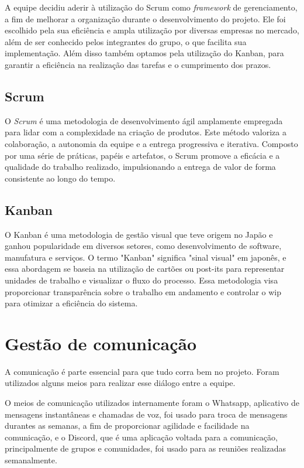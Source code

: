 A equipe decidiu aderir à utilização do Scrum como \textit{framework} de gerenciamento, a fim de melhorar a organização durante o desenvolvimento do projeto. Ele foi escolhido pela sua eficiência e ampla utilização por diversas empresas no mercado, além de ser conhecido pelos integrantes do grupo, o que facilita sua implementação.  Além disso também optamos pela utilização do Kanban, para garantir a eficiência na realização das tarefas e o cumprimento dos prazos.

\subsection{Scrum}

O \textit{Scrum} é uma metodologia de desenvolvimento ágil amplamente empregada para lidar com a complexidade na criação de produtos. Este método valoriza a colaboração, a autonomia da equipe e a entrega progressiva e iterativa. Composto por uma série de práticas, papéis e artefatos, o Scrum promove a eficácia e a qualidade do trabalho realizado, impulsionando a entrega de valor de forma consistente ao longo do tempo.

\subsection{Kanban}

O Kanban é uma metodologia de gestão visual que teve origem no Japão e ganhou popularidade em diversos setores, como desenvolvimento de software, manufatura e serviços. O termo "Kanban" significa "sinal visual" em japonês, e essa abordagem se baseia na utilização de cartões ou post-its para representar unidades de trabalho e visualizar o fluxo do processo. Essa metodologia visa proporcionar transparência sobre o trabalho em andamento e controlar o \ac{wip} para otimizar a eficiência do sistema.

\section{Gestão de comunicação}
A comunicação é parte essencial para que tudo corra bem no projeto. Foram utilizados alguns meios para realizar esse diálogo entre a equipe.

O meios de comunicação utilizados internamente foram o  Whatsapp, aplicativo de mensagens instantâneas  e chamadas de voz, foi usado para troca de mensagens durantes as semanas, a fim de proporcionar agilidade e facilidade na comunicação, e o Discord, que é uma aplicação voltada para a comunicação, principalmente de grupos e comunidades, foi usado para as reuniões realizadas semanalmente.

